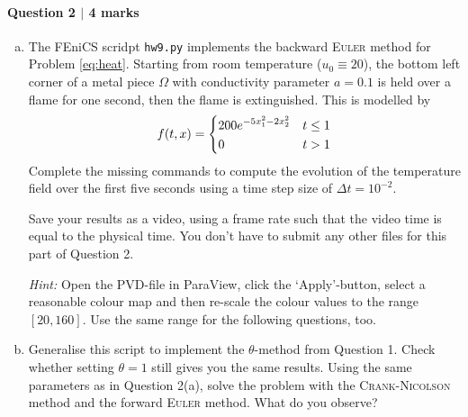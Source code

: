 \newpage
\paragraph*{Question 2 $\vert$ 4 marks}

\begin{enumerate}[(a)]
\item%
The \textsf{FEniCS} scridpt \texttt{hw9.py} implements the backward \textsc{Euler} method for Problem \eqref{eq:heat}. Starting from room temperature ($u_0 \equiv 20$), the bottom left corner of a metal piece $\Omega$ with conductivity parameter $a=0.1$ is held over a flame for one second, then the flame is extinguished. This is modelled by
\begin{equation*}
f(t,x) =
\begin{dcases}
200e^{-5x_1^2 - 2x_2^2} & t \leq 1\\
0 & t > 1
\end{dcases}
\end{equation*}
Complete the missing commands to compute the evolution of the temperature field over the first five seconds using a time step size of $\Delta t = 10^{-2}$.

Save your results as a video, using a frame rate such that the video time is equal to the physical time. You don't have to submit any other files for this part of Question 2.

\emph{Hint:} Open the PVD-file in \textsf{ParaView}, click the `Apply'-button, select a reasonable colour map
and then re-scale the colour values
to the range $[20,160]$. Use the same range for the following questions, too.

\vspace{0.5cm}
\begin{solution}


\end{solution}

\newpage
\item%
Generalise this script to implement the $\theta$-method from Question 1. Check whether setting $\theta = 1$ still gives you the same results. Using the same parameters as in Question 2(a), solve the problem with the \textsc{Crank-Nicolson} method and the forward \textsc{Euler} method. What do you observe?


\end{enumerate}
